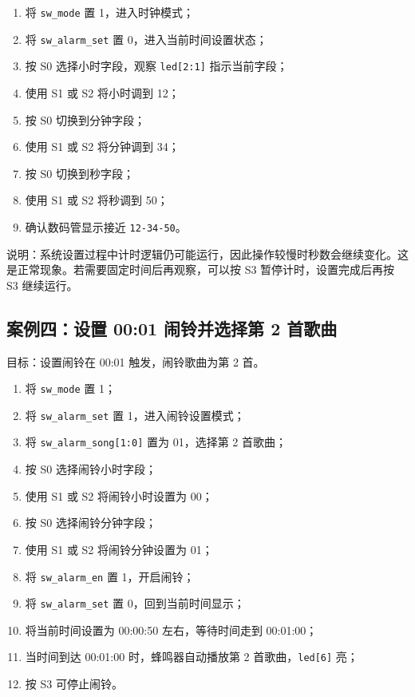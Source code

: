 \documentclass[UTF8,a4paper,12pt]{ctexart}
\newcommand{\port}[1]{\texttt{#1}}
\begin{document}
\begin{enumerate}
  \item 将 \port{sw\_mode} 置 1，进入时钟模式；
  \item 将 \port{sw\_alarm\_set} 置 0，进入当前时间设置状态；
  \item 按 S0 选择小时字段，观察 \port{led[2:1]} 指示当前字段；
  \item 使用 S1 或 S2 将小时调到 12；
  \item 按 S0 切换到分钟字段；
  \item 使用 S1 或 S2 将分钟调到 34；
  \item 按 S0 切换到秒字段；
  \item 使用 S1 或 S2 将秒调到 50；
  \item 确认数码管显示接近 \port{12-34-50}。
\end{enumerate}

说明：系统设置过程中计时逻辑仍可能运行，因此操作较慢时秒数会继续变化。这是正常现象。若需要固定时间后再观察，可以按 S3 暂停计时，设置完成后再按 S3 继续运行。

\subsection{案例四：设置 00:01 闹铃并选择第 2 首歌曲}

目标：设置闹铃在 00:01 触发，闹铃歌曲为第 2 首。

\begin{enumerate}
  \item 将 \port{sw\_mode} 置 1；
  \item 将 \port{sw\_alarm\_set} 置 1，进入闹铃设置模式；
  \item 将 \port{sw\_alarm\_song[1:0]} 置为 01，选择第 2 首歌曲；
  \item 按 S0 选择闹铃小时字段；
  \item 使用 S1 或 S2 将闹铃小时设置为 00；
  \item 按 S0 选择闹铃分钟字段；
  \item 使用 S1 或 S2 将闹铃分钟设置为 01；
  \item 将 \port{sw\_alarm\_en} 置 1，开启闹铃；
  \item 将 \port{sw\_alarm\_set} 置 0，回到当前时间显示；
  \item 将当前时间设置为 00:00:50 左右，等待时间走到 00:01:00；
  \item 当时间到达 00:01:00 时，蜂鸣器自动播放第 2 首歌曲，\port{led[6]} 亮；
  \item 按 S3 可停止闹铃。
\end{enumerate}
\end{document}
